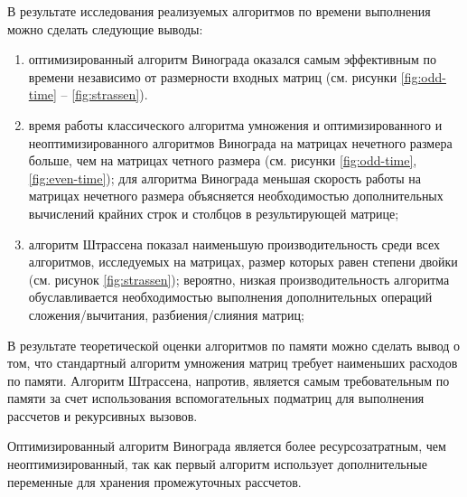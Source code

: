 В результате исследования реализуемых алгоритмов по времени выполнения можно сделать следующие выводы:
\begin{enumerate}
    \item оптимизированный алгоритм Винограда оказался самым эффективным по времени независимо от размерности входных матриц (см. рисунки \ref{fig:odd-time} -- \ref{fig:strassen}).
    \item время работы классического алгоритма умножения и оптимизированного и неоптимизированного алгоритмов Винограда на матрицах нечетного размера больше, чем на матрицах четного размера (см. рисунки \ref{fig:odd-time}, \ref{fig:even-time});
    для алгоритма Винограда меньшая скорость работы на матрицах нечетного размера объясняется необходимостью дополнительных вычислений крайних строк и столбцов в результирующей матрице;
    \item алгоритм Штрассена показал наименьшую производительность среди всех алгоритмов, исследуемых на матрицах, размер которых равен степени двойки (см. рисунок \ref{fig:strassen});
    вероятно, низкая производительность алгоритма обуславливается необходимостью выполнения дополнительных операций сложения/вычитания, разбиения/слияния матриц;
\end{enumerate}

В результате теоретической оценки алгоритмов по памяти можно сделать вывод о том, что стандартный алгоритм умножения матриц требует наименьших расходов по памяти.
Алгоритм Штрассена, напротив, является самым требовательным по памяти за счет использования вспомогательных подматриц для выполнения рассчетов и рекурсивных вызовов.

Оптимизированный алгоритм Винограда является более ресурсозатратным, чем неоптимизированный, так как первый алгоритм использует дополнительные переменные для хранения промежуточных рассчетов.